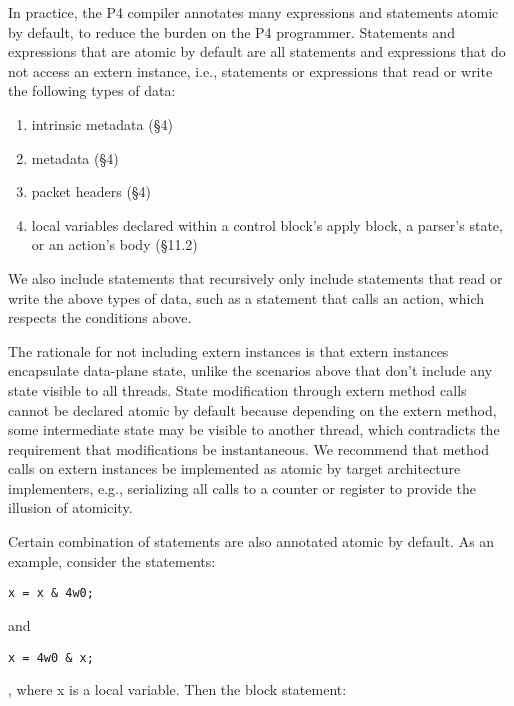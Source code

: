 In practice, the P4 compiler annotates many expressions and statements atomic
 by default, to reduce the burden on the P4 programmer.
Statements and expressions that are atomic by default are all statements and
expressions that do not access an extern instance, i.e., statements or
expressions that read or write the following types of data:
\begin{enumerate}
\item intrinsic metadata (\S4)
\item metadata (\S4)
\item packet headers (\S4)
\item local variables declared within a control block's apply block, a parser's
state, or an action's body (\S11.2)
\end{enumerate}
We also include statements that recursively only include statements that read
or write the above types of data, such as a statement that calls an action,
which respects the conditions above.

The rationale for not including extern instances is that extern instances
encapsulate data-plane state, unlike the scenarios above that don't include any
state visible to all threads. State modification through extern method calls
cannot be declared atomic by default because depending on the extern method,
some intermediate state may be visible to another thread, which contradicts the
requirement that modifications be instantaneous. We recommend that method calls
on extern instances be implemented as atomic by target architecture
implementers, e.g., serializing all calls to a counter or register to provide
the illusion of atomicity.

Certain combination of statements are also annotated atomic by default. As an
example, consider the statements:
\begin{verbatim}
x = x & 4w0;
\end{verbatim}

and
\begin{verbatim}
x = 4w0 & x;
\end{verbatim},
where x is a local variable. Then the block statement:

